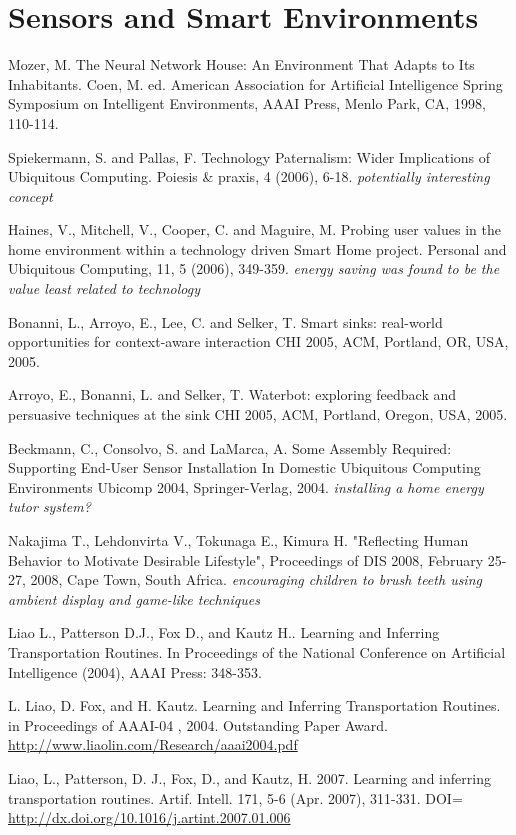 \section{Sensors and Smart Environments}


Mozer, M. The Neural Network House: An Environment That Adapts to Its Inhabitants. Coen, M. ed. American Association for Artificial Intelligence Spring Symposium on Intelligent Environments, AAAI Press, Menlo Park, CA, 1998, 110-114.

Spiekermann, S. and Pallas, F. Technology Paternalism: Wider Implications of Ubiquitous Computing. Poiesis \& praxis, 4 (2006), 6-18. \emph{potentially interesting concept}

Haines, V., Mitchell, V., Cooper, C. and Maguire, M. Probing user values in the home environment within a technology driven Smart Home project. Personal and Ubiquitous Computing, 11, 5 (2006), 349-359. \emph{energy saving was found to be the value least related to technology}

Bonanni, L., Arroyo, E., Lee, C. and Selker, T. Smart sinks: real-world opportunities for context-aware interaction CHI 2005, ACM, Portland, OR, USA, 2005.

Arroyo, E., Bonanni, L. and Selker, T. Waterbot: exploring feedback and persuasive techniques at the sink CHI 2005, ACM, Portland, Oregon, USA, 2005.

Beckmann, C., Consolvo, S. and LaMarca, A. Some Assembly Required: Supporting End-User Sensor Installation In Domestic Ubiquitous Computing Environments Ubicomp 2004, Springer-Verlag, 2004. \emph{installing a home energy tutor system?}

Nakajima T., Lehdonvirta V., Tokunaga E., Kimura H. "Reflecting Human Behavior to Motivate Desirable Lifestyle", Proceedings of DIS 2008, February 25-27, 2008, Cape Town, South Africa. \emph{encouraging children to brush teeth using ambient display and game-like techniques}

Liao L., Patterson D.J., Fox D., and Kautz H.. Learning and Inferring Transportation Routines. In Proceedings of the National Conference on Artificial Intelligence (2004), AAAI Press: 348-353.

L. Liao, D. Fox, and H. Kautz. Learning and Inferring Transportation Routines. in Proceedings of AAAI-04 , 2004. Outstanding Paper Award. \url{http://www.liaolin.com/Research/aaai2004.pdf}

Liao, L., Patterson, D. J., Fox, D., and Kautz, H. 2007. Learning and inferring transportation routines. Artif. Intell. 171, 5-6 (Apr. 2007), 311-331. DOI= \url{http://dx.doi.org/10.1016/j.artint.2007.01.006}

